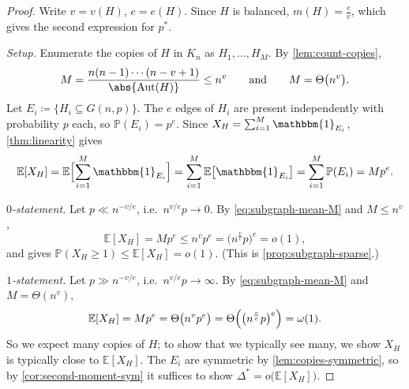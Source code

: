 \begin{proof}
    Write \(v = v(H)\), \(e = e(H)\). Since \(H\) is balanced, \(m(H) = \frac{e}{v}\), which gives the second expression for \(p^{*}\).

    \emph{Setup.} Enumerate the copies of \(H\) in \(K_n\) as \(H_1, \ldots, H_M\). By \autoref{lem:count-copies},
    \[
        M = \frac{n(n-1)\cdots(n-v+1)}{\abs{\mathrm{Aut}(H)}} \le n^{v}
        \qquad\text{and}\qquad
        M = \Theta\bigl( n^{v} \bigr).
    \]
    Let \(E_i \coloneqq \{H_i \subseteq G(n,p)\}\). The \(e\) edges of \(H_i\) are present independently with probability \(p\) each, so \(\mathbb{P}(E_i) = p^{e}\). Since \(X_H = \sum_{i=1}^{M} \mathbbm{1}_{E_i}\), \autoref{thm:linearity} gives
    \begin{equation}\label{eq:subgraph-mean-M}
        \mathbb{E}[X_H] = \mathbb{E}\Bigl[ \sum_{i=1}^{M} \mathbbm{1}_{E_i} \Bigr] = \sum_{i=1}^{M} \mathbb{E}\bigl[ \mathbbm{1}_{E_i} \bigr] = \sum_{i=1}^{M} \mathbb{P}(E_i) = M p^{e} .
    \end{equation}

    \emph{\(0\)-statement.} Let \(p \ll n^{-v/e}\), i.e.\ \(n^{v/e} p \to 0\). By \eqref{eq:subgraph-mean-M} and \(M \le n^{v}\),
    \[
        \mathbb{E}[X_H] = M p^{e} \le n^{v} p^{e} = \bigl( n^{\frac{v}{e}} p \bigr)^{e} = o(1),
    \]
    and  gives \(\mathbb{P}(X_H \ge 1) \le \mathbb{E}[X_H] = o(1)\). (This is \autoref{prop:subgraph-sparse}.)

    \emph{\(1\)-statement.} Let \(p \gg n^{-v/e}\), i.e.\ \(n^{v/e} p \to \infty\). By \eqref{eq:subgraph-mean-M} and \(M = \Theta(n^{v})\),
    \[
        \mathbb{E}[X_H] = M p^{e} = \Theta\bigl( n^{v}p^{e} \bigr) = \Theta\Bigl( \bigl( n^{\frac{v}{e}} p \bigr)^{e} \Bigr) = \omega(1).
    \]
    So we expect many copies of \(H\); to show that we typically see many, we show \(X_H\) is typically close to \(\mathbb{E}[X_H]\). The \(E_i\) are symmetric by \autoref{lem:copies-symmetric}, so by \autoref{cor:second-moment-sym} it suffices to show \(\Delta^{*} = o\bigl( \mathbb{E}[X_H] \bigr)\).


\end{proof}
